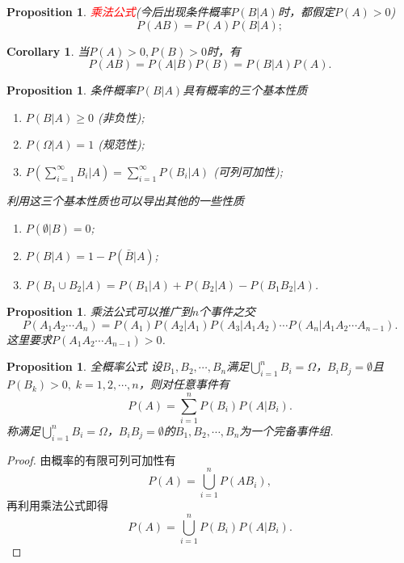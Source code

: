 \documentclass{article}
\newtheorem{corollary}[theorem]{Corollary}
\newtheorem{proposition}[theorem]{Proposition}
\newcommand{\redt}[1]{\textcolor{red}{#1}}
\begin{document}
\begin{proposition}
\rm \redt{乘法公式}(今后出现条件概率$P(B|A)$时，都假定$P(A) > 0$)
$$
P(AB) = P(A)P(B|A);
$$
\end{proposition}

\begin{corollary}
\rm 当$P(A) > 0,P(B) > 0$时，有
$$
P(AB) = P(A|B)P(B) = P(B|A)P(A).
$$
\end{corollary}

\begin{proposition}
\rm 条件概率$P(B|A)$具有概率的三个基本性质
\begin{enumerate}
	\item $P(B|A) \geq 0$ (非负性);
	\item $P(\Omega|A) = 1$ (规范性);
	\item $P(\sum\limits_{i=1}^{\infty} B_i | A) = \sum\limits_{i=1}^{\infty}P(B_i | A)$ (可列可加性); 
\end{enumerate}

利用这三个基本性质也可以导出其他的一些性质
\begin{enumerate}
	\item $P(\emptyset | B) = 0$;
	\item $P(B|A) = 1 - P(\bar{B} | A)$;
	\item $P(B_1 \cup B_2 | A) = P(B_1 | A) + P(B_2 | A) - P(B_1B_2 |A)$. 
\end{enumerate}
\end{proposition}

\begin{proposition}
\rm 乘法公式可以推广到$n$个事件之交
$$
P(A_1A_2\cdots A_n) = P(A_1)P(A_2|A_1)P(A_3|A_1A_2)\cdots P(A_n|A_1A_2\cdots A_{n-1}).
$$
这里要求$P(A_1A_2\cdots A_{n-1}) > 0$. 
\end{proposition}

\begin{proposition}
\rm {\color{red}全概率公式} 设$B_1,B_2,\cdots,B_n$满足$\bigcup\limits_{i=1}^n B_i = \Omega$，$B_iB_j = \emptyset$且$P(B_k) > 0,\; k=1,2,\cdots,n$，则对任意事件有
$$
P(A) = \sum\limits_{i=1}^n P(B_i)P(A|B_i).
$$
称满足$\bigcup\limits_{i=1}^n B_i = \Omega$，$B_iB_j = \emptyset$的$B_1,B_2,\cdots,B_n$为一个{\color{red}完备事件组}.
\end{proposition}

\begin{proof}
由概率的有限可列可加性有
$$
P(A) = \bigcup\limits_{i=1}^n P(AB_i),
$$
再利用乘法公式即得
$$
P(A) = \bigcup\limits_{i=1}^n P(B_i)P(A|B_i).
$$
\end{proof}
\end{document}
